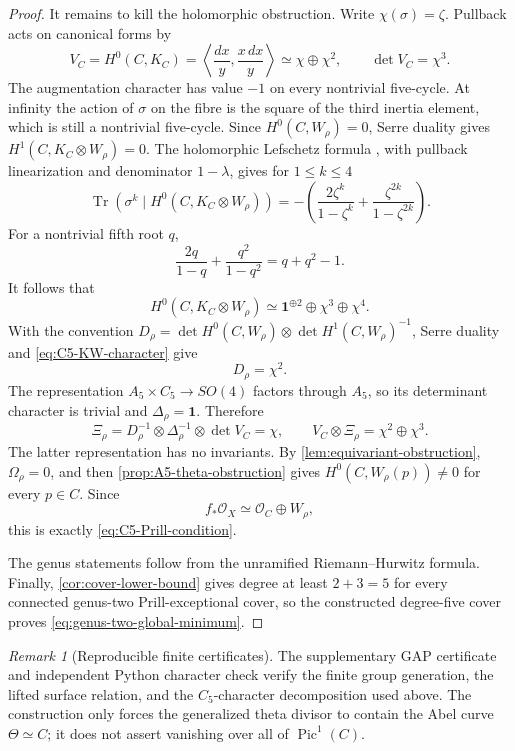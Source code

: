 \documentclass[11pt,reqno]{amsart}
\numberwithin{equation}{section}
\theoremstyle{remark}
\newtheorem{remark}[remark]{Remark}
\newcommand{\cO}{\mathcal O}
\begin{document}
\begin{proof}
It remains to kill the holomorphic obstruction.  Write
\(\chi(\sigma)=\zeta\).  Pullback acts on canonical forms by
\[
 V_C=H^0(C,K_C)
 =\left\langle\frac{dx}{y},\frac{x\,dx}{y}\right\rangle
 \simeq\chi\oplus\chi^2,\qquad \det V_C=\chi^3.
\tag{6.34}\label{eq:C5-Hodge-character}
\]
The augmentation character has value \(-1\) on every nontrivial
five-cycle.  At infinity the action of \(\sigma\) on the fibre is the
square of the third inertia element, which is still a nontrivial
five-cycle.  Since \(H^0(C,W_\rho)=0\), Serre duality gives
\(H^1(C,K_C\otimes W_\rho)=0\).  The holomorphic Lefschetz formula
\cite{AtiyahBottLefschetz},
with pullback linearization and denominator \(1-\lambda\), gives for
\(1\leq k\leq4\)
\[
 \operatorname{Tr}\!\left(\sigma^k\mid
 H^0(C,K_C\otimes W_\rho)\right)
 =-\left(
 \frac{2\zeta^k}{1-\zeta^k}
 +\frac{\zeta^{2k}}{1-\zeta^{2k}}
 \right).
\tag{6.35}\label{eq:C5-Lefschetz-trace}
\]
For a nontrivial fifth root \(q\),
\[
 \frac{2q}{1-q}+\frac{q^2}{1-q^2}=q+q^2-1.
\]
It follows that
\[
 H^0(C,K_C\otimes W_\rho)
 \simeq\mathbf1^{\oplus2}\oplus\chi^3\oplus\chi^4.
\tag{6.36}\label{eq:C5-KW-character}
\]
With the convention
\(D_\rho=\det H^0(C,W_\rho)\otimes
\det H^1(C,W_\rho)^{-1}\), Serre duality and
\eqref{eq:C5-KW-character} give
\[
 D_\rho=\chi^2.
\]
The representation \(A_5\times C_5\to SO(4)\) factors through
\(A_5\), so its determinant character is trivial and
\(\Delta_\rho=\mathbf1\).
Therefore
\[
 \Xi_\rho=D_\rho^{-1}\otimes\Delta_\rho^{-1}\otimes\det V_C
 =\chi,
 \qquad
 V_C\otimes\Xi_\rho=\chi^2\oplus\chi^3.
\tag{6.37}\label{eq:C5-Xi-character}
\]
The latter representation has no invariants.  By
\cref{lem:equivariant-obstruction}, \(\Omega_\rho=0\), and then
\cref{prop:A5-theta-obstruction} gives
\(H^0(C,W_\rho(p))\neq0\) for every \(p\in C\).  Since
\[
 f_*\cO_X\simeq\cO_C\oplus W_\rho,
\]
this is exactly \eqref{eq:C5-Prill-condition}.

The genus statements follow from the unramified Riemann--Hurwitz
formula.  Finally, \cref{cor:cover-lower-bound} gives degree at least
\(2+3=5\) for every connected genus-two Prill-exceptional cover, so
the constructed degree-five cover proves
\eqref{eq:genus-two-global-minimum}.
\end{proof}

\begin{remark}[Reproducible finite certificates]
The supplementary GAP certificate and independent Python character
check verify the finite group generation, the lifted surface relation,
and the \(C_5\)-character decomposition used above.  The construction only
forces the generalized theta divisor to contain the Abel curve
\(\Theta\simeq C\); it does not assert vanishing over all of
\(\operatorname{Pic}^1(C)\).
\end{remark}
\end{document}
